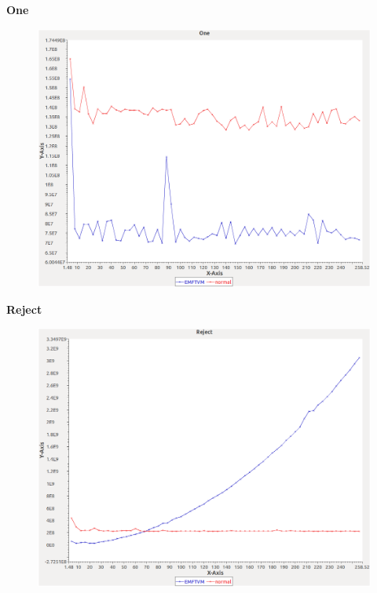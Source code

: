 \noindent\textbf{One}

\begin{figure}[h]
\centering
\includegraphics[width=\textwidth]{../graphs/set/One}
\end{figure}
\pagebreak

\noindent\textbf{Reject}

\begin{figure}[h]
\centering
\includegraphics[width=\textwidth]{../graphs/set/Reject}
\end{figure}
\pagebreak

